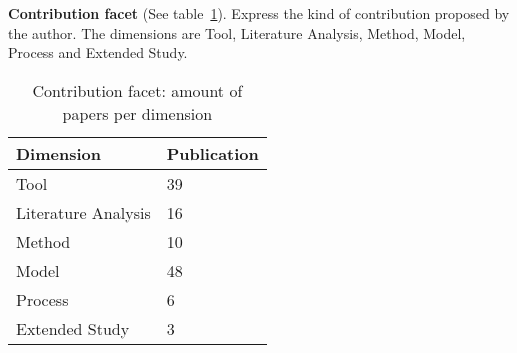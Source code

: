 \textbf{Contribution facet} (See table~\ref{table:contribution}).
Express the kind of contribution proposed by the author. 
The dimensions are Tool, Literature Analysis, Method, Model, Process and Extended Study.

\begin{table}[h]
\begin{center}
\begin{tabular}{p{4cm}p{4cm}}
\hline 
\textbf{Dimension} & \textbf{Publication} \\ 
\hline 
Tool & 39\\ 
\hline 
Literature Analysis & 16 \\ 
\hline 
Method & 10 \\ 
\hline 
Model & 48 \\  
\hline 
Process & 6 \\ 
\hline 
Extended Study & 3 \\ 
\hline 
\end{tabular}
\end{center}
\caption{Contribution facet: amount of papers per dimension}\label{table:contribution}
\end{table}

